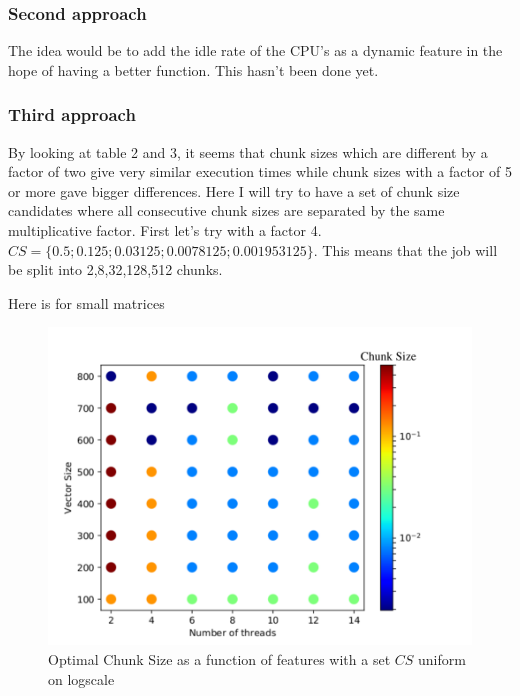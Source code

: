 \subsubsection{Second approach}

The idea would be to add the idle rate of the CPU's as a dynamic feature in the hope of having a better function.
This hasn't been done yet.

\subsubsection{Third approach}
By looking at table 2 and 3, it seems that chunk sizes which are different by a factor of two give very similar execution times while chunk sizes with a factor of 5 or more gave bigger differences. Here I will try to have a set of chunk size candidates where all consecutive chunk sizes are separated by the same multiplicative factor. First let's try with a factor 4. $CS=\{0.5;0.125;0.03125;0.0078125;0.001953125\}$. This means that the job will be split into 2,8,32,128,512 chunks.

Here is for small matrices

\begin{figure}[H]
	\centering
	\includegraphics[width=120mm]{images/chunk_size_function_matrix_uniform_log.pdf}
	\caption{Optimal Chunk Size as a function of features with a set $CS$ uniform on logscale}
\end{figure}

